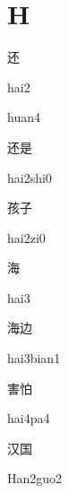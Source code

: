 ﻿%
\section*{H}
\begin{multicols*}{2}

\begin{verbete}[hai2]{还}
\begin{pronuncia}{hai2}
\end{pronuncia}
\begin{pronuncia}{huan4}
\end{pronuncia}
\end{verbete}

\begin{verbete}{还是}
\begin{pronuncia}{hai2shi0}
\end{pronuncia}
\end{verbete}

\begin{verbete}[hai2zi0]{孩子}
\begin{pronuncia}{hai2zi0}
\end{pronuncia}
\end{verbete}

\begin{verbete}[hai3]{海}
\begin{pronuncia}{hai3}
\end{pronuncia}
\end{verbete}

\begin{verbete}{海边}
\begin{pronuncia}{hai3bian1}
\end{pronuncia}
\end{verbete}

\begin{verbete}[hai4pa4]{害怕}
\begin{pronuncia}{hai4pa4}
\end{pronuncia}
\end{verbete}

\begin{verbete}{汉国}
\begin{pronuncia}{Han2guo2}
\end{pronuncia}
\end{verbete}


\end{multicols*}
